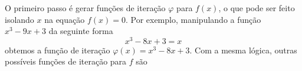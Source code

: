 



O primeiro passo é gerar funções de iteração $\varphi$ para $f(x)$, o que pode ser feito isolando $x$ na equação $f(x) = 0$. Por exemplo, manipulando a função $x^3 -9x + 3$  da seguinte forma 
\begin{equation*}
    x^3 - 8x + 3 = x 
\end{equation*} 
obtemos a função de iteração $\varphi(x) = x^3 - 8x + 3$. Com a mesma lógica, outras possíveis funções de iteração para $f$ são


